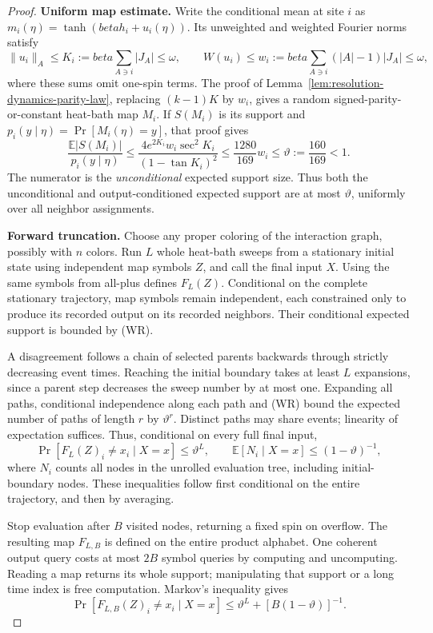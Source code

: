 \documentclass[11pt]{article}
\theoremstyle{definition}
\theoremstyle{remark}
\def\beta{beta}\def\gamma{gamma}\def\lambda{lambda}%
\begin{document}
\begin{proof}
\textbf{Uniform map estimate.}
Write the conditional mean at site \(i\) as
\(m_i(\eta)=\tanh(\beta h_i+u_i(\eta))\). Its unweighted and
weighted Fourier norms satisfy
\[
 \|u_i\|_A\le K_i:=\beta\sum_{A\ni i}|J_A|\le\omega,
 \qquad W(u_i)\le w_i:=\beta\sum_{A\ni i}(|A|-1)|J_A|\le\omega,
\]
where these sums omit one-spin terms. The proof of
Lemma~\ref{lem:resolution-dynamics-parity-law}, replacing
\((k-1)K\) by \(w_i\), gives a random signed-parity-or-constant
heat-bath map \(M_i\). If \(S(M_i)\) is its support and
\(p_i(y\mid\eta)=\Pr[M_i(\eta)=y]\), that proof gives
\[
 \frac{\mathbb E|S(M_i)|}{p_i(y\mid\eta)}
 \le\frac{4e^{2K_i}w_i\sec^2K_i}{(1-\tan K_i)^2}
 \le\frac{1280}{169}w_i
 \le\vartheta:=\frac{160}{169}<1.                 \tag{WR}
\]
The numerator is the \emph{unconditional} expected support size.
Thus both the unconditional and output-conditioned expected support
are at most \(\vartheta\), uniformly over all neighbor assignments.

\textbf{Forward truncation.}
Choose any proper coloring of the interaction graph, possibly with
\(n\) colors. Run \(L\) whole heat-bath sweeps from a stationary
initial state using independent map symbols \(Z\), and call the
final input \(X\). Using the same symbols from all-plus defines
\(F_L(Z)\). Conditional on the complete stationary trajectory, map
symbols remain independent, each constrained only to produce its
recorded output on its recorded neighbors. Their conditional expected
support is bounded by (WR).

A disagreement follows a chain of selected parents backwards through
strictly decreasing event times. Reaching the initial boundary takes
at least \(L\) expansions, since a parent step decreases the sweep
number by at most one. Expanding all paths, conditional independence
along each path and (WR) bound the expected number of paths of length
\(r\) by \(\vartheta^r\). Distinct paths may share events; linearity
of expectation suffices. Thus, conditional on every full final input,
\[
 \Pr[F_L(Z)_i\ne x_i\mid X=x]\le\vartheta^L,
 \qquad
 \mathbb E[N_i\mid X=x]\le(1-\vartheta)^{-1},     \tag{FW}
\]
where \(N_i\) counts all nodes in the unrolled evaluation tree,
including initial-boundary nodes. These inequalities follow first
conditional on the entire trajectory, and then by averaging.

Stop evaluation after \(B\) visited nodes, returning a fixed spin on
overflow. The resulting map \(F_{L,B}\) is defined on the entire
product alphabet. One coherent output query costs at most \(2B\)
symbol queries by computing and uncomputing. Reading a map returns its
whole support; manipulating that support or a long time index is free
computation. Markov's inequality gives
\[
 \Pr[F_{L,B}(Z)_i\ne x_i\mid X=x]
 \le\vartheta^L+[B(1-\vartheta)]^{-1}.             \tag{TF}
\]


\end{proof}
\end{document}
